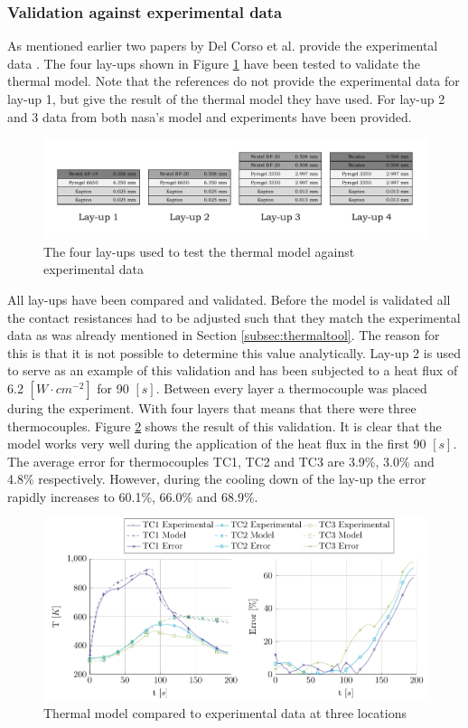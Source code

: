\subsubsection{Validation against experimental data}
As mentioned earlier two papers by Del Corso et al. provide the experimental data \cite{Corso2009,Corso2011}. The four lay-ups shown in Figure \ref{fig:vallayup} have been tested to validate the thermal model. Note that the references do not provide the experimental data for lay-up 1, but give the result of the thermal model they have used. For lay-up 2 and 3 data from both \gls{nasa}'s model and experiments have been provided. 


\begin{figure}[h]
	\centering
	\includegraphics[width=\textwidth]{Figure/Thermal/vallayup.pdf}
	\caption{The four lay-ups used to test the thermal model against experimental data}
	\label{fig:vallayup}
\end{figure}

All lay-ups have been compared and validated. Before the model is validated all the contact resistances had to be adjusted such that they match the experimental data as was already mentioned in Section \ref{subsec:thermaltool}. The reason for this is that it is not possible to determine this value analytically. Lay-up 2 is used to serve as an example of this validation and has been subjected to a heat flux of 6.2 $\left[W\cdot cm^{-2}\right]$ for 90 $\left[s\right]$. Between every layer a thermocouple was placed during the experiment. With four layers that means that there were three thermocouples. Figure \ref{fig:plotvallay2} shows the result of this validation. It is clear that the model works very well during the application of the heat flux in the first 90 $\left[s\right]$. The average error for thermocouples TC1, TC2 and TC3 are 3.9\%, 3.0\% and 4.8\% respectively. However, during the cooling down of the lay-up the error rapidly increases to 60.1\%, 66.0\% and 68.9\%.

\begin{figure}[H]
	\centering
	\includegraphics[width=\textwidth]{Figure/Thermal/plotvallay2.pdf}
	\caption{Thermal model compared to experimental data at three locations}
	\label{fig:plotvallay2}
\end{figure}


